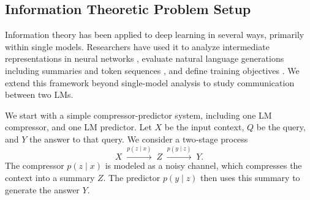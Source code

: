 \documentclass{article} %
\begin{document}

\subsection{Information Theoretic Problem Setup}
\label{sec:info-theoretic-setup}
Information theory has been applied to deep learning in several ways, primarily within single models. Researchers have used it to analyze intermediate representations in neural networks \citep{kawaguchi2023does, tishby2015deep}, evaluate natural language generations including summaries and token sequences \citep{arda2025rate, darrin-etal-2024-cosmic, shani2025tokens}, and define training objectives  \citep{kirsch2020unpacking, goldfeld2020information}. We extend this framework beyond single-model analysis to study communication between two LMs.

We start with a simple compressor-predictor system, including one LM compressor, and one LM predictor.
Let $X$ be the input context, $Q$ be the query, and $Y$ the answer to that query. We consider a two‐stage process
\[
X \;\xrightarrow{p(z\mid x)}\; Z \;\xrightarrow{p(y\mid z)}\; Y.
\]
The compressor $p(z\mid x)$ is modeled as a noisy channel, which compresses the context into a summary \(Z\). The predictor $p(y\mid z)$ then uses this summary to generate the answer \(Y\).

\end{document}
